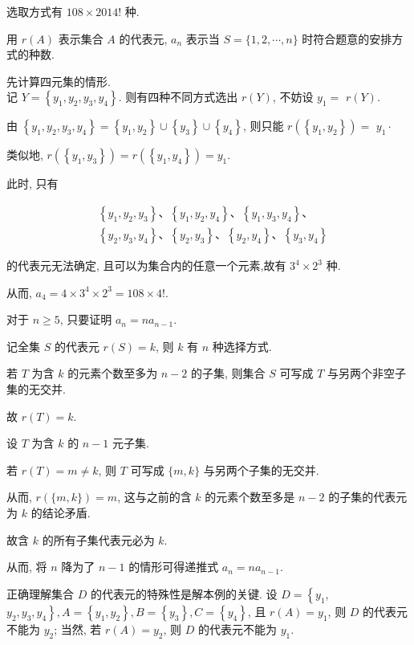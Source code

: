 \begin{solution}
选取方式有 $108 \times 2014!$ 种.

用 $r(A)$ 表示集合 $A$ 的代表元, $a_{n}$ 表示当 $S=\{1,2, \cdots, n\}$ 时符合题意的安排方式的种数.

先计算四元集的情形.\\
记 $Y=\left\{y_{1}, y_{2}, y_{3}, y_{4}\right\}$. 则有四种不同方式选出 $r(Y)$, 不妨设 $y_{1}=$ $r(Y)$.

由 $\left\{y_{1}, y_{2}, y_{3}, y_{4}\right\}=\left\{y_{1}, y_{2}\right\} \cup\left\{y_{3}\right\} \cup\left\{y_{4}\right\}$, 则只能 $r\left(\left\{y_{1}, y_{2}\right\}\right)=$ $y_{1} \cdot$

类似地, $r\left(\left\{y_{1}, y_{3}\right\}\right)=r\left(\left\{y_{1}, y_{4}\right\}\right)=y_{1}$.

此时, 只有

$$
\begin{aligned}
& \left\{y_{1}, y_{2}, y_{3}\right\} 、\left\{y_{1}, y_{2}, y_{4}\right\} 、\left\{y_{1}, y_{3}, y_{4}\right\} 、 \\
& \left\{y_{2}, y_{3}, y_{4}\right\} 、\left\{y_{2}, y_{3}\right\} 、\left\{y_{2}, y_{4}\right\} 、\left\{y_{3}, y_{4}\right\}
\end{aligned}
$$

的代表元无法确定, 且可以为集合内的任意一个元素,故有 $3^{4} \times 2^{3}$ 种.

从而, $a_{4}=4 \times 3^{4} \times 2^{3}=108 \times 4!$.

对于 $n \geqslant 5$, 只要证明 $a_{n}=n a_{n-1}$.

记全集 $S$ 的代表元 $r(S)=k$, 则 $k$ 有 $n$ 种选择方式.

若 $T$ 为含 $k$ 的元素个数至多为 $n-2$ 的子集, 则集合 $S$ 可写成 $T$ 与另两个非空子集的无交并.

故 $r(T)=k$.

设 $T$ 为含 $k$ 的 $n-1$ 元子集.

若 $r(T)=m \neq k$, 则 $T$ 可写成 $\{m, k\}$ 与另两个子集的无交并.

从而, $r(\{m, k\})=m$, 这与之前的含 $k$ 的元素个数至多是 $n-2$ 的子集的代表元为 $k$ 的结论矛盾.

故含 $k$ 的所有子集代表元必为 $k$.

从而, 将 $n$ 降为了 $n-1$ 的情形可得递推式 $a_{n}=n a_{n-1}$.
\end{solution}

\begin{note}
正确理解集合 $D$ 的代表元的特殊性是解本例的关键. 设 $D=\left\{y_{1}\right.$, $\left.y_{2}, y_{3}, y_{4}\right\}, A=\left\{y_{1}, y_{2}\right\}, B=\left\{y_{3}\right\}, C=\left\{y_{4}\right\}$, 且 $r(A)=y_{1}$, 则 $D$ 的代表元不能为 $y_{2}$; 当然, 若 $r(A)=y_{2}$, 则 $D$ 的代表元不能为 $y_{1}$.
\end{note}

